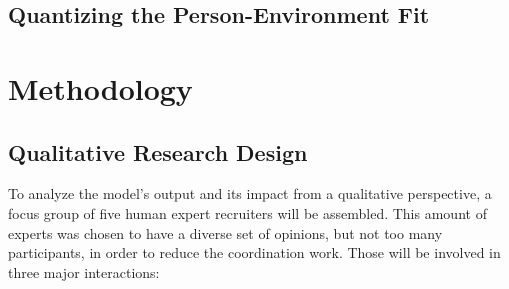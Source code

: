 \documentclass[draft,final]{thesisclass} %
\begin{document}
\section{Quantizing the Person-Environment Fit}
\lipsum[1]

\chapter{Methodology} \label{methodology}

\section{Qualitative Research Design} \label{qualitative_research_design}
To analyze the model's output and its impact from a qualitative perspective, a focus group of five human expert recruiters will be assembled.
This amount of experts was chosen to have a diverse set of opinions, but not too many participants, in order to reduce the coordination work.
Those will be involved in three major interactions:
\end{document}
